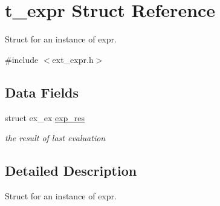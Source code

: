 \hypertarget{structt__expr}{
\section{t\_\-expr Struct Reference}
\label{structt__expr}
}


Struct for an instance of expr.  


{\ttfamily \#include $<$ext\_\-expr.h$>$}\subsection*{Data Fields}
\begin{DoxyCompactItemize}
\item 
\hypertarget{structt__expr_ae7598104dbb81f2a3b09618b578fbf03}{
struct ex\_\-ex \hyperlink{structt__expr_ae7598104dbb81f2a3b09618b578fbf03}{exp\_\-res}}
\label{structt__expr_ae7598104dbb81f2a3b09618b578fbf03}

\begin{DoxyCompactList}\small\item\em the result of last evaluation \item\end{DoxyCompactList}\end{DoxyCompactItemize}


\subsection{Detailed Description}
Struct for an instance of expr. 